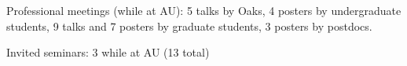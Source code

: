 \begin{veryTightItemize}
    \item Professional meetings (while at AU): 5 talks by Oaks,
        4 posters by undergraduate students,
        9 talks and 7 posters by graduate students,
        3 posters by postdocs.
    \item Invited seminars: 3 while at AU (13 total)
\end{veryTightItemize}
